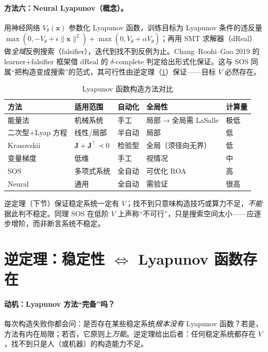 \paragraph{方法六：Neural Lyapunov（概念）。}
用神经网络 $V_\theta(\mathbf{x})$ 参数化 Lyapunov 函数，训练目标为 Lyapunov 条件的违反量 $\max(0,-V_\theta+\epsilon\|\mathbf{x}\|^2)+\max(0,\dot V_\theta+\alpha V_\theta)$；再用 SMT 求解器（dReal）做\emph{全域}反例搜索（falsifier），迭代到找不到反例为止。Chang–Roohi–Gao 2019\cite{chang2019neural} 的 learner+falsifier 框架借 dReal 的 $\delta$-complete 判定给出形式化保证。这与 SOS 同属“把构造变成搜索”的范式，其可行性由逆定理（\cref{sec:lyap-converse}）保证——目标 $V$ 必然存在。

\begin{table}[H]\centering\small
\caption{Lyapunov 函数构造方法对比}
\label{tab:lyap-construct}
\begin{tabular}{lllll}
\toprule
方法 & 适用范围 & 自动化 & 全局性 & 计算量 \\
\midrule
能量法 & 机械系统 & 手工 & 局部$\to$全局需 LaSalle & 极低 \\
二次型+Lyap 方程 & 线性/局部 & 半自动 & 局部 & 低 \\
Krasovskii & $\mathbf{J}+\mathbf{J}^\top\prec0$ & 检验型 & 全局（须径向无界） & 低 \\
变量梯度 & 低维 & 手工 & 视情况 & 中 \\
SOS & 多项式系统 & 全自动 & 可优化 ROA & 高 \\
Neural & 通用 & 全自动 & 需验证 & 很高 \\
\bottomrule
\end{tabular}
\end{table}

\begin{pitfall}
逆定理（下节）保证稳定系统一定有 $V$；找不到只意味构造技巧或算力不足，\emph{不能}据此判不稳定。同理 SOS 在低阶 $V$ 上声称“不可行”，只是搜索空间太小——应逐步增阶，而非断言系统不稳定。
\end{pitfall}

\section{逆定理：稳定性 \texorpdfstring{$\Leftrightarrow$}{<=>} Lyapunov 函数存在}
\label{sec:lyap-converse}

\paragraph{动机：Lyapunov 方法“完备”吗？}
每次构造失败你都会问：是否存在某些稳定系统\emph{根本没有} Lyapunov 函数？若是，方法有内在局限；若否，它原则上\emph{万能}。逆定理给出后者：任何稳定系统都存在 $V$，找不到只是人（或机器）的构造能力不足。

